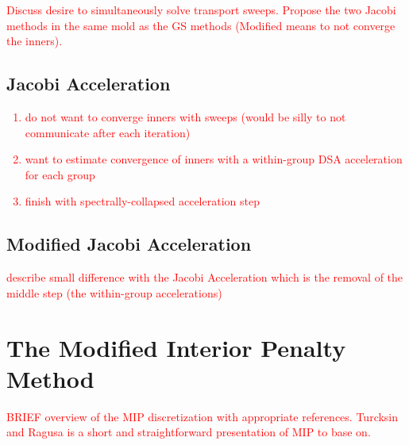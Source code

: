 \documentclass[preprint,10pt]{elsarticle}
\newcommand{\tcr}[1]{\textcolor{red}{#1}}
\begin{document}
\tcr{Discuss desire to simultaneously solve transport sweeps. Propose the two Jacobi methods in the same mold as the GS methods (Modified means to not converge the inners).}

\subsection{Jacobi Acceleration}

\tcr
{
\begin{enumerate}
\item do not want to converge inners with sweeps (would be silly to not communicate after each iteration)
\item want to estimate convergence of inners with a within-group DSA acceleration for each group
\item finish with spectrally-collapsed acceleration step
\end{enumerate}
}

\subsection{Modified Jacobi Acceleration}

\tcr{
describe small difference with the Jacobi Acceleration which is the removal of the middle step (the within-group accelerations)
}

\section{The Modified Interior Penalty Method} \label{sec::MIP}

\tcr{BRIEF overview of the MIP discretization with appropriate references. Turcksin and Ragusa is a short and straightforward presentation of MIP to base on.}

\end{document}
